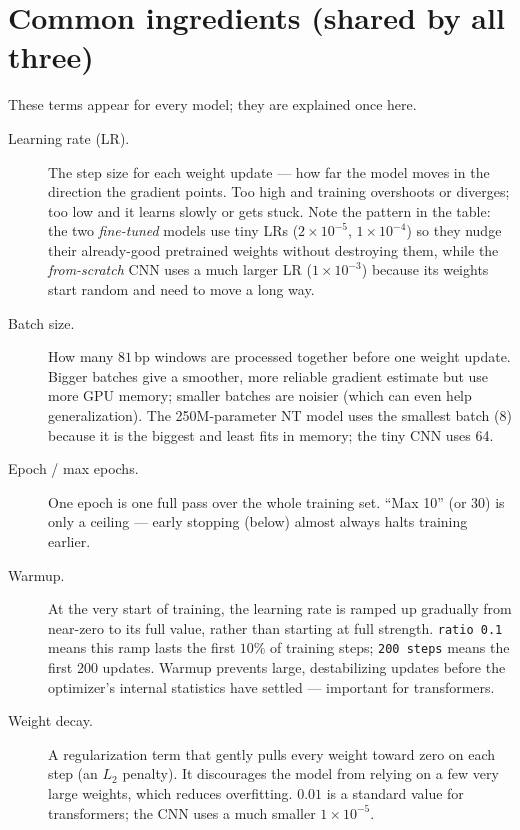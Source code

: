 \documentclass{article}
\begin{document}
\section{Common ingredients (shared by all three)}
These terms appear for every model; they are explained once here.

\begin{description}
\item[Learning rate (LR).] The step size for each weight update --- how far the model moves in the direction the gradient points. Too high and training overshoots or diverges; too low and it learns slowly or gets stuck. Note the pattern in the table: the two \emph{fine-tuned} models use tiny LRs ($2\times10^{-5}$, $1\times10^{-4}$) so they nudge their already-good pretrained weights without destroying them, while the \emph{from-scratch} CNN uses a much larger LR ($1\times10^{-3}$) because its weights start random and need to move a long way.

\item[Batch size.] How many $81$\,bp windows are processed together before one weight update. Bigger batches give a smoother, more reliable gradient estimate but use more GPU memory; smaller batches are noisier (which can even help generalization). The 250M-parameter NT model uses the smallest batch (8) because it is the biggest and least fits in memory; the tiny CNN uses 64.

\item[Epoch / max epochs.] One epoch is one full pass over the whole training set. ``Max 10'' (or 30) is only a ceiling --- early stopping (below) almost always halts training earlier.

\item[Warmup.] At the very start of training, the learning rate is ramped up gradually from near-zero to its full value, rather than starting at full strength. \texttt{ratio 0.1} means this ramp lasts the first $10\%$ of training steps; \texttt{200 steps} means the first 200 updates. Warmup prevents large, destabilizing updates before the optimizer's internal statistics have settled --- important for transformers.

\item[Weight decay.] A regularization term that gently pulls every weight toward zero on each step (an $L_2$ penalty). It discourages the model from relying on a few very large weights, which reduces overfitting. $0.01$ is a standard value for transformers; the CNN uses a much smaller $1\times10^{-5}$.


\end{description}
\end{document}
